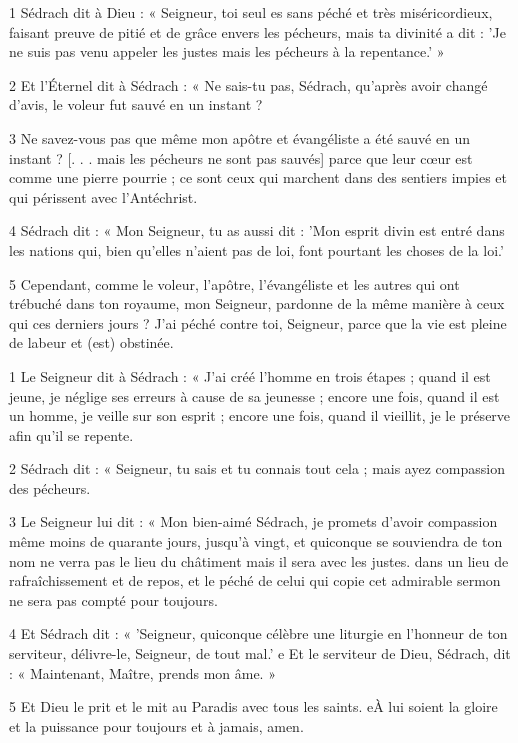 
\par 1 Sédrach dit à Dieu : « Seigneur, toi seul es sans péché et très miséricordieux, faisant preuve de pitié et de grâce envers les pécheurs, mais ta divinité a dit : 'Je ne suis pas venu appeler les justes mais les pécheurs à la repentance.' »

\par 2 Et l'Éternel dit à Sédrach : « Ne sais-tu pas, Sédrach, qu'après avoir changé d'avis, le voleur fut sauvé en un instant ?

\par 3 Ne savez-vous pas que même mon apôtre et évangéliste a été sauvé en un instant ? [. . . mais les pécheurs ne sont pas sauvés] parce que leur cœur est comme une pierre pourrie ; ce sont ceux qui marchent dans des sentiers impies et qui périssent avec l’Antéchrist.

\par 4 Sédrach dit : « Mon Seigneur, tu as aussi dit : 'Mon esprit divin est entré dans les nations qui, bien qu'elles n'aient pas de loi, font pourtant les choses de la loi.'

\par 5 Cependant, comme le voleur, l'apôtre, l'évangéliste et les autres qui ont trébuché dans ton royaume, mon Seigneur, pardonne de la même manière à ceux qui ces derniers jours ? J'ai péché contre toi, Seigneur, parce que la vie est pleine de labeur et (est) obstinée.


\par 1 Le Seigneur dit à Sédrach : « J'ai créé l'homme en trois étapes ; quand il est jeune, je néglige ses erreurs à cause de sa jeunesse ; encore une fois, quand il est un homme, je veille sur son esprit ; encore une fois, quand il vieillit, je le préserve afin qu'il se repente.

\par 2 Sédrach dit : « Seigneur, tu sais et tu connais tout cela ; mais ayez compassion des pécheurs.

\par 3 Le Seigneur lui dit : « Mon bien-aimé Sédrach, je promets d'avoir compassion même moins de quarante jours, jusqu'à vingt, et quiconque se souviendra de ton nom ne verra pas le lieu du châtiment mais il sera avec les justes. dans un lieu de rafraîchissement et de repos, et le péché de celui qui copie cet admirable sermon ne sera pas compté pour toujours.

\par 4 Et Sédrach dit : « 'Seigneur, quiconque célèbre une liturgie en l'honneur de ton serviteur, délivre-le, Seigneur, de tout mal.' e Et le serviteur de Dieu, Sédrach, dit : « Maintenant, Maître, prends mon âme. »

\par 5 Et Dieu le prit et le mit au Paradis avec tous les saints. eÀ lui soient la gloire et la puissance pour toujours et à jamais, amen.




